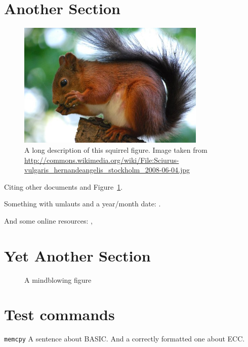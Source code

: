 \section{Another Section}

\begin{figure}[tbp]
    \centering
    \includegraphics[width=0.8\textwidth]{images/squirrel}
    \caption[Short description]{A long description of this squirrel figure.
    Image taken from
    \url{http://commons.wikimedia.org/wiki/File:Sciurus-vulgaris_hernandeangelis_stockholm_2008-06-04.jpg}}
    \label{fig:squirrel}
\end{figure}

Citing \cite{bellard2005qfa} other documents \cite{bellard2005qfa, boileau06}
and Figure~\ref{fig:squirrel}.

Something with umlauts and a year/month date:
\cite{becher04:_feurig_hacken_mit_firew}.

And some online resources: \cite{green04}, \cite{patent:4819234}


\section{Yet Another Section}


\begin{figure}[tbp]
    \caption{A mindblowing figure}
    \label{fig:todo}
\end{figure}

\section{Test commands}

\drops \LLinux \NOVA \QEMU
\texttt{memcpy}
A sentence about BASIC. And a correctly formatted one about ECC\@.

\cleardoublepage

